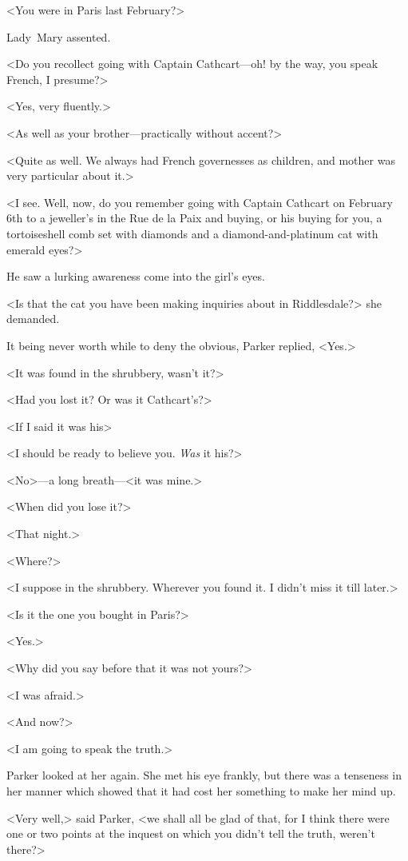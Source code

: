 <You were in Paris last February?>

Lady~Mary assented.

<Do you recollect going with Captain Cathcart—oh! by the way, you speak French, I presume?>

<Yes, very fluently.>

<As well as your brother—practically without accent?>

<Quite as well. We always had French governesses as children, and mother was very particular about it.>

<I see. Well, now, do you remember going with Captain Cathcart on February 6th to a jeweller's in the Rue de la Paix and buying, or his buying for you, a tortoiseshell comb set with diamonds and a diamond-and-platinum cat with emerald eyes?>

He saw a lurking awareness come into the girl's eyes.

<Is that the cat you have been making inquiries about in Riddlesdale?> she demanded.

It being never worth while to deny the obvious, Parker replied, <Yes.>

<It was found in the shrubbery, wasn't it?>

<Had you lost it? Or was it Cathcart's?>

<If I said it was his\longdash>

<I should be ready to believe you. \emph{Was} it his?>

<No>—a long breath—<it was mine.>

<When did you lose it?>

<That night.>

<Where?>

<I suppose in the shrubbery. Wherever you found it. I didn't miss it till later.>

<Is it the one you bought in Paris?>

<Yes.>

<Why did you say before that it was not yours?>

<I was afraid.>

<And now?>

<I am going to speak the truth.>

Parker looked at her again. She met his eye frankly, but there was a tenseness in her manner which showed that it had cost her something to make her mind up.

<Very well,> said Parker, <we shall all be glad of that, for I think there were one or two points at the inquest on which you didn't tell the truth, weren't there?>

